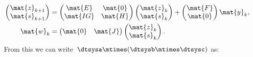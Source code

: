 \begin{equation*}
    \label{eq:dlin-6}
    \begin{aligned}
        \begin{pmatrix}
            \mat{z}_{k+1} \\
            \mat{s}_{k+1}
        \end{pmatrix} & =
        \begin{pmatrix}
            \mat{E}  & \mat{0} \\
            \mat{IG} & \mat{H}
        \end{pmatrix}
        \begin{pmatrix}
            \mat{z}_k \\ \mat{s}_k
        \end{pmatrix}+
        \begin{pmatrix}
            \mat{F} \\ \mat{0}
        \end{pmatrix}\mat{y}_k, \\
        \mat{w}_k        & =
        \begin{pmatrix}
            \mat{0} & \mat{J}
        \end{pmatrix}
        \begin{pmatrix}
            \mat{z}_k \\ \mat{s}_k
        \end{pmatrix}.
    \end{aligned}
\end{equation*}
From this we can write~$\dtsysa\mtimes (\dtsysb\mtimes \dtsysc)$ as:
